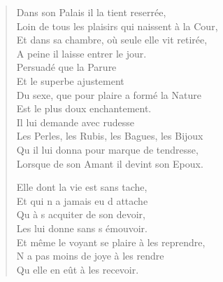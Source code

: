 \begin{verse}
\vin Dans son Palais il la tient reserrée, \\
Loin de tous les plaisirs qui naissent à la Cour, \\
Et dans sa chambre, où seule elle vit retirée, \\
\vin A peine il laisse entrer le jour. \\
\vin Persuadé que la Parure \\
\vin Et le superbe ajustement \\
Du sexe, que pour plaire a formé la Nature \\
\vin Est le plus doux enchantement. \\
\vin Il lui demande avec rudesse \\
Les Perles, les Rubis, les Bagues, les Bijoux \\
\vin Qu\textquotesingle{} il lui donna pour marque de tendresse, \\
Lorsque de son Amant il devint son Epoux.

\vin Elle dont la vie est sans tache, \\
\vin Et qui n\textquotesingle{} a jamais eu d\textquotesingle{} attache \\
\vin Qu\textquotesingle{} à s\textquotesingle{} acquiter de son devoir, \\
\vin Les lui donne sans s\textquotesingle{} émouvoir. \\
Et même le voyant se plaire à les reprendre, \\
\vin N\textquotesingle{} a pas moins de joye à les rendre \\
\vin Qu\textquotesingle{} elle en eût à les recevoir.


\end{verse}
